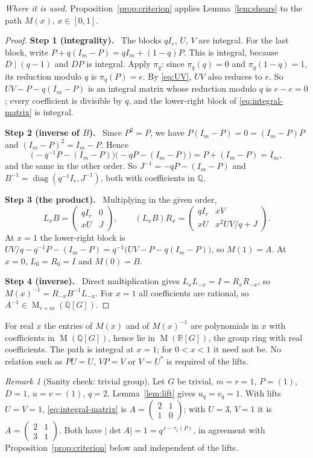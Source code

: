 \documentclass[11pt]{article}
\theoremstyle{remark}
\newtheorem{remark}[theorem]{Remark}
\numberwithin{equation}{section}
\newcommand{\Q}{\mathbb Q}
\newcommand{\R}{\mathbb R}
\newcommand{\Mat}{\operatorname{M}}
\newcommand{\diag}{\operatorname{diag}}
\newcommand{\step}[1]{\par\smallskip\noindent\textbf{Step #1.}\ }
\begin{document}
\noindent\emph{Where it is used.} Proposition~\ref{prop:criterion} applies Lemma~\ref{lem:shears} to the path $M(x)$, $x\in[0,1]$.

\begin{proof}
\step{1 (integrality)}
The blocks $qI_r$, $U$, $V$ are integral. For the last block, write $P+q(I_m-P)=qI_m+(1-q)P$. This is integral, because $D\mid(q-1)$ and $DP$ is integral. Apply $\pi_q$: since $\pi_q(q)=0$ and $\pi_q(1-q)=1$, its reduction modulo $q$ is $\pi_q(P)=e$. By \eqref{eq:UV}, $UV$ also reduces to $e$. So $UV-P-q(I_m-P)$ is an integral matrix whose reduction modulo $q$ is $e-e=0$; every coefficient is divisible by $q$, and the lower-right block of \eqref{eq:integral-matrix} is integral.

\step{2 (inverse of $B$)}
Since $P^2=P$, we have $P(I_m-P)=0=(I_m-P)P$ and $(I_m-P)^2=I_m-P$. Hence
\[
 \bigl(-q^{-1}P-(I_m-P)\bigr)\bigl(-qP-(I_m-P)\bigr)=P+(I_m-P)=I_m ,
\]
and the same in the other order. So $J^{-1}=-qP-(I_m-P)$ and $B^{-1}=\diag(q^{-1}I_r,J^{-1})$, both with coefficients in $\Q$.

\step{3 (the product)}
Multiplying in the given order,
\[
 L_xB=\begin{pmatrix}qI_r&0\\xU&J\end{pmatrix},\qquad
 (L_xB)R_x=\begin{pmatrix}qI_r&xV\\xU&x^2UV/q+J\end{pmatrix}.
\]
At $x=1$ the lower-right block is $UV/q-q^{-1}P-(I_m-P)=q^{-1}\bigl(UV-P-q(I_m-P)\bigr)$, so $M(1)=A$. At $x=0$, $L_0=R_0=I$ and $M(0)=B$.

\step{4 (inverse)}
Direct multiplication gives $L_xL_{-x}=I=R_xR_{-x}$, so $M(x)^{-1}=R_{-x}B^{-1}L_{-x}$. For $x=1$ all coefficients are rational, so $A^{-1}\in\Mat_{r+m}(\Q[G])$.
\end{proof}

For real $x$ the entries of $M(x)$ and of $M(x)^{-1}$ are polynomials in $x$ with coefficients in $\Mat(\Q[G])$, hence lie in $\Mat(\R[G])$, the group ring with real coefficients. The path is integral at $x=1$; for $0<x<1$ it need not be. No relation such as $PU=U$, $VP=V$ or $V=U^*$ is required of the lifts.

\begin{remark}[Sanity check: trivial group]\label{rem:example}
Let $G$ be trivial, $m=r=1$, $P=(1)$, $D=1$, $u=v=(1)$, $q=2$. Lemma~\ref{lem:lift} gives $u_q=v_q=1$. With lifts $U=V=1$, \eqref{eq:integral-matrix} is $A=\begin{pmatrix}2&1\\1&0\end{pmatrix}$; with $U=3$, $V=1$ it is $A=\begin{pmatrix}2&1\\3&1\end{pmatrix}$. Both have $|\det A|=1=q^{\,r-\tau_1(P)}$, in agreement with Proposition~\ref{prop:criterion} below and independent of the lifts.
\end{remark}
\end{document}
